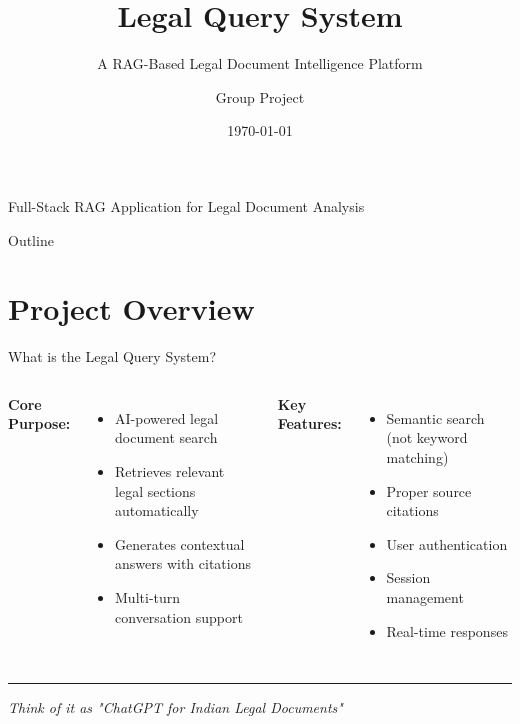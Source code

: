 \documentclass[11pt,aspectratio=16:9]{beamer}
\title{Legal Query System}
\subtitle{A RAG-Based Legal Document Intelligence Platform}
\author{Group Project}
\date{\today}
\begin{document}
\begin{frame}
    \titlepage
    \vspace{-1cm}
    \begin{center}
        {\small Full-Stack RAG Application for Legal Document Analysis}
    \end{center}
\end{frame}

\begin{frame}{Outline}
    \tableofcontents
\end{frame}

\section{Project Overview}

\begin{frame}{What is the Legal Query System?}
    \begin{columns}
        \textbf{Core Purpose:}
        \begin{itemize}
            \item AI-powered legal document search
            \item Retrieves relevant legal sections automatically
            \item Generates contextual answers with citations
            \item Multi-turn conversation support
        \end{itemize}
        
        \textbf{Key Features:}
        \begin{itemize}
            \item Semantic search (not keyword matching)
            \item Proper source citations
            \item User authentication
            \item Session management
            \item Real-time responses
        \end{itemize}
    \end{columns}
    
    \vspace{0.5cm}
    \hrule
    \vspace{0.5cm}
    
    {\small \textit{Think of it as "ChatGPT for Indian Legal Documents"}}
\end{frame}
\end{document}
